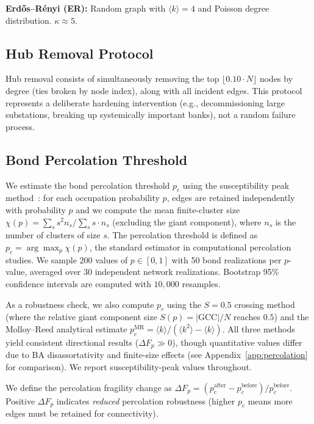 \documentclass[aps,pre,twocolumn,superscriptaddress,showpacs]{revtex4-2}
\newcommand{\avg}[1]{\langle #1 \rangle}
\newcommand{\pc}{p_c}
\newcommand{\DF}{\Delta F}
\begin{document}
\textbf{Erd\H{o}s--R\'enyi (ER):} Random graph with $\avg{k} = 4$ and Poisson degree distribution. $\kappa \approx 5$.

\subsection{Hub Removal Protocol}

Hub removal consists of simultaneously removing the top $\lfloor 0.10 \cdot N \rfloor$ nodes by degree (ties broken by node index), along with all incident edges. This protocol represents a deliberate hardening intervention (e.g., decommissioning large substations, breaking up systemically important banks), not a random failure process.

\subsection{Bond Percolation Threshold}

We estimate the bond percolation threshold $\pc$ using the susceptibility peak method~\cite{Newman2001}: for each occupation probability $p$, edges are retained independently with probability $p$ and we compute the mean finite-cluster size $\chi(p) = \sum_s s^2 n_s / \sum_s s \cdot n_s$ (excluding the giant component), where $n_s$ is the number of clusters of size $s$. The percolation threshold is defined as $\pc = \arg\max_p \chi(p)$, the standard estimator in computational percolation studies. We sample 200 values of $p \in [0,1]$ with 50 bond realizations per $p$-value, averaged over 30 independent network realizations. Bootstrap 95\% confidence intervals are computed with $10{,}000$ resamples.

As a robustness check, we also compute $\pc$ using the $S=0.5$ crossing method (where the relative giant component size $S(p) = |\mathrm{GCC}|/N$ reaches $0.5$) and the Molloy--Reed analytical estimate $p_c^{\mathrm{MR}} = \avg{k}/(\avg{k^2} - \avg{k})$. All three methods yield consistent directional results ($\DF_p \gg 0$), though quantitative values differ due to BA disassortativity and finite-size effects (see Appendix~\ref{app:percolation} for comparison). We report susceptibility-peak values throughout.

We define the percolation fragility change as $\DF_p = (\pc^{\mathrm{after}} - \pc^{\mathrm{before}})/\pc^{\mathrm{before}}$. Positive $\DF_p$ indicates \emph{reduced} percolation robustness (higher $\pc$ means more edges must be retained for connectivity).
\end{document}
